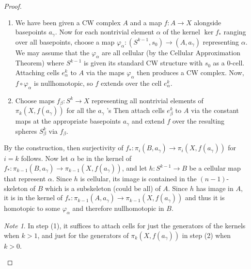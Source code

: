 \documentclass[reqno]{amsart}
\theoremstyle{definition}
\theoremstyle{remark}
\newtheorem*{note}{Note}
\begin{document}
\begin{proof}
    \begin{enumerate}
        \item We have been given
            a CW complex $A$ and a map
            $f \colon A \to X$ alongside basepoints
            $a_{\gamma}$. Now for each
            nontrivial element $\alpha$ of the kernel
            $\ker f_*$ ranging over
            all basepoints, choose
            a map $\varphi_{\alpha}\colon
            \left( S^{k-1}, s_0 \right) \to 
            \left( A, a_{\gamma} \right) $ representing
            $\alpha$. We may assume that the
            $\varphi_{\alpha}$ are all cellular (by
            the Cellular Approximation Theorem) where
            $S^{k-1}$ is given its standard CW structure
            with $s_0$ as a 0-cell. 
            Attaching cells $e_{\alpha}^{k}$ to $A$ via
            the maps $\varphi_{\alpha}$ then produces
            a CW complex. Now, $f \circ \varphi_{\alpha}$ 
            is nullhomotopic, so
            $f$ extends over the cell
            $e_{\alpha}^{k}$.
        \item Choose maps
            $f_{\beta}\colon S^{k}\to X$ representing
            all nontrivial elements of
            $\pi_k \left( X, f(a_{\gamma}) \right) $ for
            all the $a_{\gamma}$ 's Then attach
            cells $e_{\beta}^{k}$ to $A$ via the
            constant maps at the appropriate basepoints
            $a_{\gamma}$ and extend $f$ over the resulting spheres
            $S_{\beta}^{k}$ via $f_{\beta}$.
    \end{enumerate}
    By the construction, then
    surjectivity of
    $f_* \colon \pi_i \left( B, a_{\gamma} \right) 
    \to \pi_i \left( X, f(a_{\gamma}) \right) $ for
    $i = k$ follows. Now
    let $\alpha$ be in the kernel of
    $f_* \colon \pi_{k-1} (B, a_{\gamma}) \to 
    \pi_{k-1}\left( X, f(a_{\gamma}) \right) $, and
    let $h \colon S^{k-1} \to B$ be a cellular
    map that represent $\alpha$. Since
    $h$ is cellular, its image is contained in the
     $\left( n-1 \right) $-skeleton
     of $B$ which is a subskeleton (could be all) of $A$.
     Since $h$ has image in $A$, it is in the kernel
     of $f_* \colon \pi_{k-1}(A, a_{\gamma}) \to 
     \pi_{k-1} \left( X, f(a_{\gamma}) \right) $ and thus
     it is homotopic to some $\varphi_{\alpha}$ and therefore
     nullhomotopic in $B$.\\
     \begin{note}
         In step (1), it suffices to attach cells for
         just the generators of the kernels
         when $k>1$, and just for the generators
         of $\pi_k \left( X, f(a_{\gamma}) \right) $ in
         step (2) when $k>0$.
     \end{note}


\end{proof}
\end{document}
